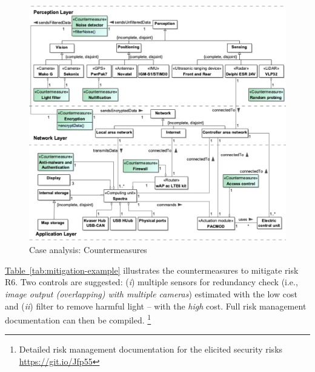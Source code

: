 \documentclass[runningheads]{llncs}
\begin{document}
\begin{figure}[h!]
  \centering
  \includegraphics[width=0.8\linewidth]{caseCount}
  \caption{Case analysis: Countermeasures} 
  \label{fig:Count}
  \vspace{-15pt}
\end{figure}

\hyperref[tab:mitigation-example]{Table~\ref{tab:mitigation-example}} illustrates the countermeasures to mitigate risk R6. Two controls are suggested: (\textit{i}) multiple sensors for redundancy check (i.e., \textit{image output (overlapping) with multiple cameras}) estimated with the low cost and (\textit{ii}) filter to remove harmful light -- with the \textit{high} cost. Full risk management documentation can then be compiled. \footnote{Detailed risk management documentation for the elicited security risks \url{https://git.io/Jfp55}}
%
\end{document}
